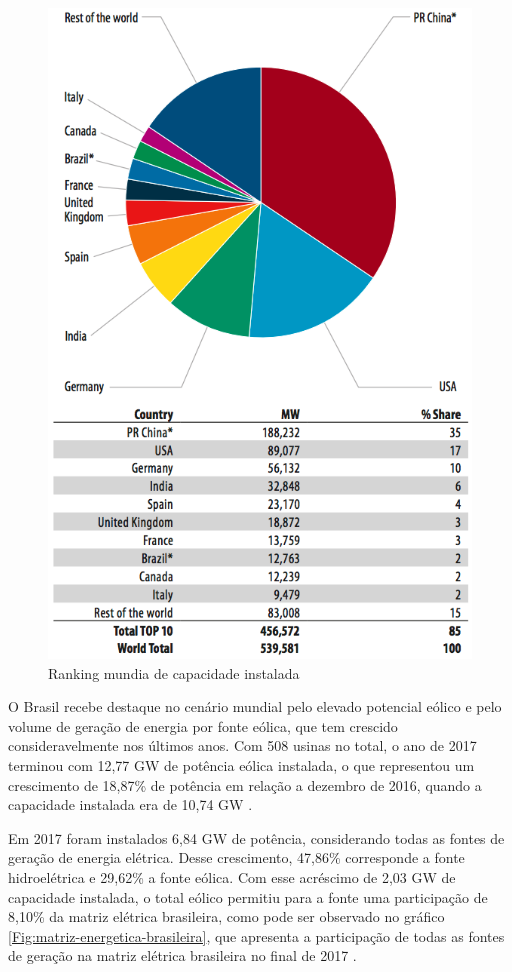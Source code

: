 \begin{figure}[htbp!] \begin{center}
\includegraphics[width=0.75\linewidth]{./figuras/grafico-capacidade-instalada-mundo}
\caption{Ranking mundia de capacidade instalada}
\label{Fig:ranking-mundial-capacidade-instalada}
\end{center} 
\end{figure}

O Brasil recebe destaque no cenário mundial pelo elevado potencial eólico e pelo volume de geração de energia por fonte eólica, que tem crescido consideravelmente nos últimos anos. Com 508 usinas no total, o ano de 2017 terminou com 12,77 GW de potência eólica instalada, o que representou um crescimento de 18,87\% de potência em relação a dezembro de 2016, quando a capacidade instalada era de 10,74 GW \cite{boletim-anual-geracao-2017}.

Em 2017 foram instalados 6,84 GW de potência, considerando todas as fontes de geração de energia elétrica. Desse crescimento, 47,86\% corresponde a fonte hidroelétrica e 29,62\% a fonte eólica. Com esse acréscimo de 2,03 GW de capacidade instalada, o total eólico permitiu para a fonte uma participação de 8,10\% da matriz elétrica brasileira, como pode ser observado no gráfico \ref{Fig:matriz-energetica-brasileira}, que apresenta a participação de todas as fontes de geração na matriz elétrica brasileira no final de 2017 \cite{boletim-anual-geracao-2017}.

